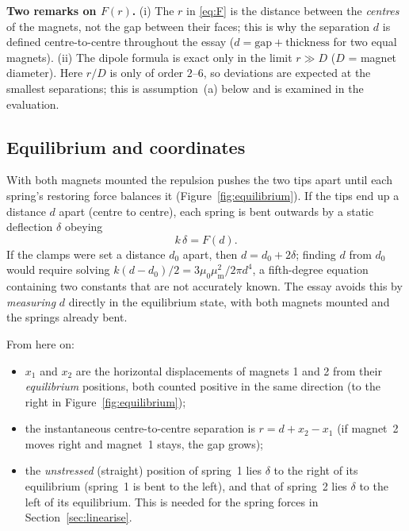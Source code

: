 \documentclass[11pt,a4paper]{article}
\newcommand{\muz}{\mu_0}
\newcommand{\mum}{\mu_{\mathrm m}}
\begin{document}
\begin{notebox}
\textbf{Two remarks on $F(r)$.} (i) The $r$ in \eqref{eq:F} is the distance between the \emph{centres} of the magnets, not the gap between their faces; this is why the separation $d$ is defined centre-to-centre throughout the essay ($d=\text{gap}+\text{thickness}$ for two equal magnets). (ii) The dipole formula is exact only in the limit $r\gg D$ ($D$ = magnet diameter). Here $r/D$ is only of order $2$--$6$, so deviations are expected at the smallest separations; this is assumption~(a) below and is examined in the evaluation.
\end{notebox}

\subsection{Equilibrium and coordinates}\label{sec:equilibrium}

With both magnets mounted the repulsion pushes the two tips apart until each spring's restoring force balances it (Figure~\ref{fig:equilibrium}). If the tips end up a distance $d$ apart (centre to centre), each spring is bent outwards by a static deflection $\delta$ obeying
\begin{equation}
k\,\delta=F(d).
\label{eq:static}
\end{equation}
If the clamps were set a distance $d_0$ apart, then $d=d_0+2\delta$; finding $d$ from $d_0$ would require solving $k(d-d_0)/2=3\muz\mum^2/2\pi d^4$, a fifth-degree equation containing two constants that are not accurately known. The essay avoids this by \emph{measuring} $d$ directly in the equilibrium state, with both magnets mounted and the springs already bent.

From here on:
\begin{itemize}[nosep,leftmargin=1.8em]
\item $x_1$ and $x_2$ are the horizontal displacements of magnets 1 and 2 from their \emph{equilibrium} positions, both counted positive in the same direction (to the right in Figure~\ref{fig:equilibrium});
\item the instantaneous centre-to-centre separation is $r=d+x_2-x_1$ (if magnet~2 moves right and magnet~1 stays, the gap grows);
\item the \emph{unstressed} (straight) position of spring~1 lies $\delta$ to the right of its equilibrium (spring~1 is bent to the left), and that of spring~2 lies $\delta$ to the left of its equilibrium. This is needed for the spring forces in Section~\ref{sec:linearise}.
\end{itemize}
\end{document}
